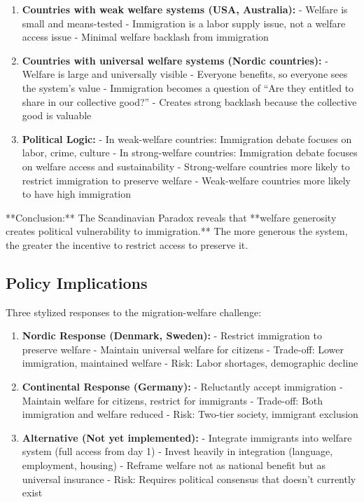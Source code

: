 \begin{enumerate}

\item \textbf{Countries with weak welfare systems (USA, Australia):}
   - Welfare is small and means-tested
   - Immigration is a labor supply issue, not a welfare access issue
   - Minimal welfare backlash from immigration

\item \textbf{Countries with universal welfare systems (Nordic countries):}
   - Welfare is large and universally visible
   - Everyone benefits, so everyone sees the system's value
   - Immigration becomes a question of ``Are they entitled to share in our collective good?''
   - Creates strong backlash because the collective good is valuable

\item \textbf{Political Logic:}
   - In weak-welfare countries: Immigration debate focuses on labor, crime, culture
   - In strong-welfare countries: Immigration debate focuses on welfare access and sustainability
   - Strong-welfare countries more likely to restrict immigration to preserve welfare
   - Weak-welfare countries more likely to have high immigration

\end{enumerate}

**Conclusion:** The Scandinavian Paradox reveals that **welfare generosity creates political vulnerability to immigration.** The more generous the system, the greater the incentive to restrict access to preserve it.

\subsection{Policy Implications}

Three stylized responses to the migration-welfare challenge:

\begin{enumerate}

\item \textbf{Nordic Response (Denmark, Sweden):}
   - Restrict immigration to preserve welfare
   - Maintain universal welfare for citizens
   - Trade-off: Lower immigration, maintained welfare
   - Risk: Labor shortages, demographic decline

\item \textbf{Continental Response (Germany):}
   - Reluctantly accept immigration
   - Maintain welfare for citizens, restrict for immigrants
   - Trade-off: Both immigration and welfare reduced
   - Risk: Two-tier society, immigrant exclusion

\item \textbf{Alternative (Not yet implemented):}
   - Integrate immigrants into welfare system (full access from day 1)
   - Invest heavily in integration (language, employment, housing)
   - Reframe welfare not as national benefit but as universal insurance
   - Risk: Requires political consensus that doesn't currently exist

\end{enumerate}

